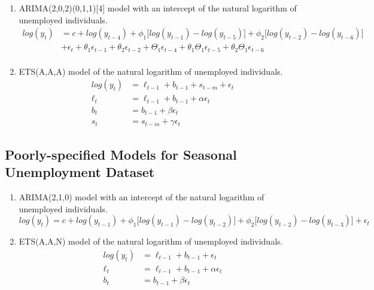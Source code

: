 \documentclass{monashthesis}
\begin{document}
\begin{enumerate}
\def\labelenumi{\arabic{enumi}.}
\item
  ARIMA(2,0,2)(0,1,1){[}4{]} model with an intercept of the natural logarithm of unemployed individuals.
  \begin{align*}
  log(y_t) &= c + log(y_{t-4}) + \phi_1\big[log(y_{t-1})-log(y_{t-5})\big] + \phi_2\big[log(y_{t-2})-log(y_{t-6})\big] \\
        &+ \epsilon_t + \theta_1\epsilon_{t-1} + \theta_2\epsilon_{t-2} + \Theta_1\epsilon_{t-4} + \theta_1\Theta_1\epsilon_{t-5} + \theta_2\Theta_1\epsilon_{t-6} \\
  \end{align*}
\item
  ETS(A,A,A) model of the natural logarithm of unemployed individuals.
  \begin{align*}
  log(y_t) &= \ell_{t-1} + b_{t-1} + s_{t-m} + \epsilon_t \\
  \ell_t &= \ell_{t-1} + b_{t-1} + \alpha \epsilon_t \\
  b_t &= b_{t-1} + \beta \epsilon_t \\
  s_{t} &= s_{t-m} + \gamma \epsilon_t
  \end{align*}
\end{enumerate}

\hypertarget{poorly-specified-models-for-seasonal-unemployment-dataset}{%
\subsection{Poorly-specified Models for Seasonal Unemployment Dataset}\label{poorly-specified-models-for-seasonal-unemployment-dataset}}

\begin{enumerate}
\def\labelenumi{\arabic{enumi}.}
\item
  ARIMA(2,1,0) model with an intercept of the natural logarithm of unemployed individuals.
  \begin{equation*}
  log(y_t) = c + log(y_{t-1}) + \phi_1\big[log(y_{t-1})-log(y_{t-2})\big] + \phi_2\big[log(y_{t-2})-log(y_{t-3})\big] + \epsilon_t
  \end{equation*}
\item
  ETS(A,A,N) model of the natural logarithm of unemployed individuals.
  \begin{align*}
  log(y_t) &= \ell_{t-1} + b_{t-1} + \epsilon_t \\
  \ell_t &= \ell_{t-1} + b_{t-1} + \alpha \epsilon_t \\
  b_t &= b_{t-1} + \beta \epsilon_t
  \end{align*}
\end{enumerate}
\end{document}
